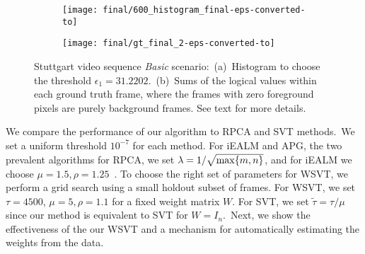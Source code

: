 \documentclass[twoside,11pt]{article}
\begin{document}
\begin{figure}[H]
	\centering
	\begin{subfigure}[b]{0.5\textwidth}
		\texttt{[image: final/600\_histogram\_final-eps-converted-to]}
		\caption{}
	\end{subfigure}
	\begin{subfigure}[b]{0.49\textwidth}
		\texttt{[image: final/gt\_final\_2-eps-converted-to]}
		\caption{}
	\end{subfigure}
	\caption{Stuttgart video sequence {\it Basic} scenario:~(a)~Histogram to choose the threshold $\epsilon_1=31.2202$.~(b)~Sums of the logical values within each ground truth frame, where the frames with zero foreground pixels are purely background frames. See text for more details.}\label{gt_hist}
\end{figure}

We compare the performance of our algorithm to RPCA and SVT methods.~We set a uniform threshold $10^{-7}$ for each method. For iEALM and APG, the two prevalent algorithms for RPCA, we set $\lambda={1}/{\sqrt{{\rm max}\{m,n\}}}$, and for iEALM we choose $\mu=1.5, \rho=1.25$~\citep{APG,candeslimawright, LinChenMa}. To choose the right set of parameters for WSVT, we perform a grid search using a small holdout subset of frames. For WSVT, we set $\tau=4500$, $\mu = 5,\rho=1.1$ for a fixed weight matrix $W$. For SVT, we set $\tilde{\tau}=\tau/\mu$ since our method is equivalent to SVT for $W=I_n$.~Next, we show the effectiveness of the our WSVT and a mechanism for automatically estimating the weights from the data. 
\end{document}
